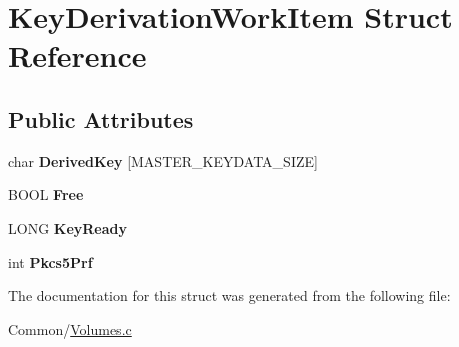 \hypertarget{struct_key_derivation_work_item}{}\section{Key\+Derivation\+Work\+Item Struct Reference}
\label{struct_key_derivation_work_item}
\subsection*{Public Attributes}
\begin{DoxyCompactItemize}
\item 
\mbox{\label{struct_key_derivation_work_item_a997da435628fd1446bd47e46235fcc32}} 
char {\bfseries Derived\+Key} \mbox{[}M\+A\+S\+T\+E\+R\+\_\+\+K\+E\+Y\+D\+A\+T\+A\+\_\+\+S\+I\+ZE\mbox{]}
\item 
\mbox{\label{struct_key_derivation_work_item_aca397b4857fdba2568c728e9103b32f8}} 
B\+O\+OL {\bfseries Free}
\item 
\mbox{\label{struct_key_derivation_work_item_acfdd9f6ed8682bfbdaa8a7a9979420aa}} 
L\+O\+NG {\bfseries Key\+Ready}
\item 
\mbox{\label{struct_key_derivation_work_item_a1ef9b19ed3a96e22f39b6eed5b3ecc3e}} 
int {\bfseries Pkcs5\+Prf}
\end{DoxyCompactItemize}


The documentation for this struct was generated from the following file\+:\begin{DoxyCompactItemize}
\item 
Common/\hyperlink{_volumes_8c}{Volumes.\+c}\end{DoxyCompactItemize}
